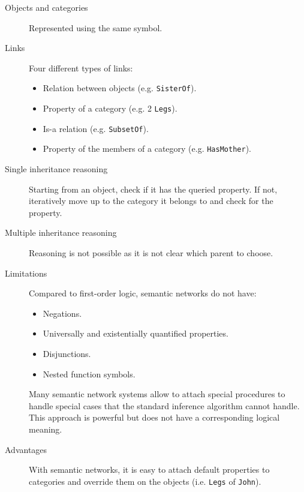 \begin{description}
    \item[Objects and categories] Represented using the same symbol.

    \item[Links] Four different types of links:
        \begin{itemize}
            \item Relation between objects (e.g. \texttt{SisterOf}).
            \item Property of a category (e.g. 2 \texttt{Legs}).
            \item Is-a relation (e.g. \texttt{SubsetOf}).
            \item Property of the members of a category (e.g. \texttt{HasMother}).
        \end{itemize} 
\end{description}

\begin{description}
    \item[Single inheritance reasoning] 
        Starting from an object, check if it has the queried property.
        If not, iteratively move up to the category it belongs to and check for the property.

    \item[Multiple inheritance reasoning] 
        Reasoning is not possible as it is not clear which parent to choose.
\end{description}

\begin{description}
    \item[Limitations]
        Compared to first-order logic, semantic networks do not have:
        \begin{itemize}
            \item Negations.
            \item Universally and existentially quantified properties.
            \item Disjunctions.
            \item Nested function symbols.
        \end{itemize}

        Many semantic network systems allow to attach special procedures to handle special cases 
        that the standard inference algorithm cannot handle.
        This approach is powerful but does not have a corresponding logical meaning.

    \item[Advantages]
        With semantic networks, it is easy to attach default properties to categories and
        override them on the objects (i.e. \texttt{Legs} of \texttt{John}).
\end{description}



